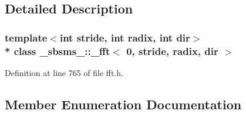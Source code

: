 \subsection{Detailed Description}
\subsubsection*{template$<$int stride, int radix, int dir$>$\\*
class \+\_\+sbsms\+\_\+\+::\+\_\+fft$<$ 0, stride, radix, dir $>$}



Definition at line 765 of file fft.\+h.



\subsection{Member Enumeration Documentation}
